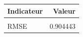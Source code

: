 \centering
\centering
\begin{tabular}[t]{lr}
\toprule
Indicateur & Valeur\\
\midrule
\cellcolor{gray!10}{EQM} & \cellcolor{gray!10}{0.818017}\\
RMSE & 0.904443\\
\bottomrule
\end{tabular}

